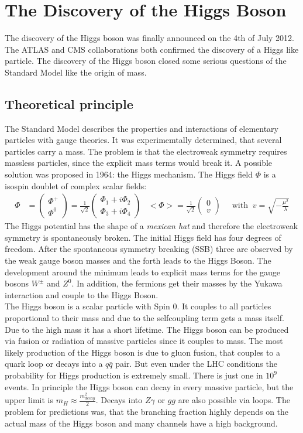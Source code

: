 \section{The Discovery of the Higgs Boson \cite{higgs}}
The discovery of the Higgs boson was finally announced on the 4th of July 2012. The ATLAS and CMS collaborations both confirmed the discovery of a Higgs like particle. The discovery of the Higgs boson closed some serious questions of the Standard Model like the origin of mass.
\subsection{Theoretical principle}
The Standard Model describes the properties and interactions of elementary particles with gauge theories. It was experimemtally determined, that several particles carry a mass. The problem is that the electroweak symmetry requires massless particles, since the explicit mass terms would break it. A possible solution was proposed in 1964: the Higgs mechanism. The Higgs field $\Phi$ is a isospin doublet of complex scalar fields:
\begin{align*}
  \Phi &=
	\begin{pmatrix}
		\Phi^+ \\
		\Phi^0
		\end{pmatrix}
	= \frac{1}{\sqrt{2}}
  \begin{pmatrix}
    \Phi_1 + i \Phi_2 \\
    \Phi_3 + i \Phi_4
  \end{pmatrix}
		& <\Phi> = \frac{1}{\sqrt{2}}
		\begin{pmatrix}
			0 \\
			v
		\end{pmatrix}
		& \;\; \text{with} \;\; v = \sqrt{-\frac{\mu^2}{\lambda}}
\end{align*}
The Higgs potential has the shape of a \textit{mexican hat} and therefore the electroweak symmetry is spontaneously broken. The initial Higgs field has four degrees of freedom. After the spontaneous symmetry breaking (SSB) three are observed by the weak gauge boson masses and the forth leads to the Higgs Boson. The development around the minimum leads to explicit mass terms for the gauge bosons $W^{\pm}$ and $Z^0$. In addition, the fermions get their masses by the Yukawa interaction and couple to the Higgs Boson. \\
The Higgs boson is a scalar particle with Spin 0. It couples to all particles proportional to their mass and due to the selfcoupling term gets a mass itself. Due to the high mass it has a short lifetime. The Higgs boson can be produced via fusion or radiation of massive particles since it couples to mass. The most likely production of the Higgs boson is due to gluon fusion, that couples to a quark loop or decays into a $q\bar{q}$ pair. But even under the LHC conditions the probability for Higgs production is extremely small. There is just one in $10^9$ events. In principle the Higgs boson can decay in every massive particle, but the upper limit is $m_H\approx \frac{m_{decay}^2}{2}$. Decays into $Z\gamma$ or $gg$ are also possible via loops. The problem for predictions was, that the branching fraction highly depends on the actual mass of the Higgs boson and many channels have a high background.
